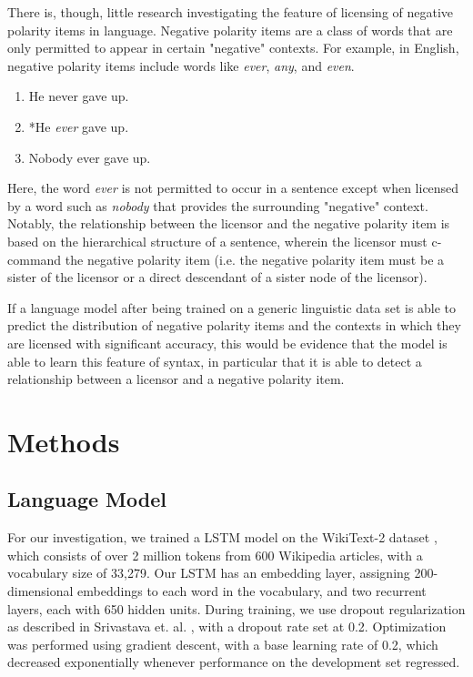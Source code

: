 \documentclass[11pt, round]{article}
\begin{document}
There is, though, little research investigating the feature of licensing of negative polarity items in language. Negative polarity items are a class of words that are only permitted to appear in certain "negative" contexts. For example, in English, negative polarity items include words like \textit{ever}, \textit{any}, and \textit{even}.
\begin{enumerate}
    \item He never gave up.
    \item *He \textit{ever} gave up.
    \item Nobody ever gave up.
\end{enumerate}
Here, the word \textit{ever} is not permitted to occur in a sentence except when licensed by a word such as \textit{nobody} that provides the surrounding "negative" context. Notably, the relationship between the licensor and the negative polarity item is based on the hierarchical structure of a sentence, wherein the licensor must c-command the negative polarity item (i.e. the negative polarity item must be a sister of the licensor or a direct descendant of a sister node of the licensor).

If a language model after being trained on a generic linguistic data set is able to predict the distribution of negative polarity items and the contexts in which they are licensed with significant accuracy, this would be evidence that the model is able to learn this feature of syntax, in particular that it is able to detect a relationship between a licensor and a negative polarity item.

\section{Methods}

\subsection{Language Model}

For our investigation, we trained a LSTM model on the WikiText-2 dataset \cite{merity2016pointer}, which consists of over 2 million tokens from 600 Wikipedia articles, with a vocabulary size of 33,279. Our LSTM has an embedding layer, assigning 200-dimensional embeddings to each word in the vocabulary, and two recurrent layers, each with 650 hidden units. During training, we use dropout regularization as described in Srivastava et. al. , with a dropout rate set at 0.2. Optimization was performed using gradient descent, with a base learning rate of 0.2, which decreased exponentially whenever performance on the development set regressed.
\end{document}
